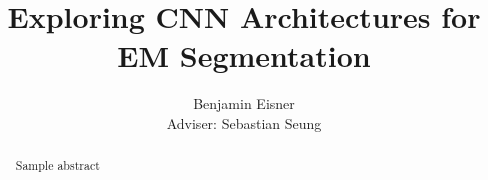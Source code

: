 \documentclass[pageno]{sty/jpaper}
\begin{document}
\title{
Exploring CNN Architectures for EM Segmentation}

\author{Benjamin Eisner\\Adviser: Sebastian Seung}

\date{}
\maketitle

\thispagestyle{empty}
\doublespacing
\begin{abstract}
Sample abstract
\end{abstract}











\end{document}

